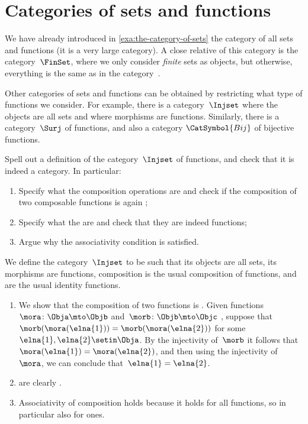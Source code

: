 
\section{Categories of sets and functions}

We have already introduced in \cref{exa:the-category-of-sets} the category of all sets and functions (it is a very large category).
A close relative of this category is the category~$\FinSet$, where we only consider \emph{finite} sets as objects, but otherwise, everything is the same as in the category~\Set.

Other categories of sets and functions can be obtained by restricting what type of functions we consider.
For example, there is a category~$\Injset$ where the objects are all sets and where morphisms are  functions.
Similarly, there is a category~$\Surj$ of  functions, and also a category $\CatSymbol{Bij}$ of bijective functions.

\begin{exercise}
    Spell out a definition of the category~$\Injset$ of  functions, and check that it is indeed a category.
    In particular:
    \begin{enumerate}
        \item Specify what the composition operations are and check if the composition of two composable  functions is again ;
        \item Specify what the   are and check that they are indeed  functions;
        \item Argue why the associativity condition is satisfied.
    \end{enumerate}
\end{exercise}

\begin{solution}
    We define the category~$\Injset$ to be such that its objects are all sets, its morphisms are  functions, composition is the usual composition of functions, and  are the usual identity functions.
    \begin{enumerate}
        \item We show that the composition of two  functions is .
              Given functions~$\mora \colon \Obja \mto \Objb$ and~$\morb \colon \Objb \mto \Objc$ , suppose that~$\morb(\mora (\elna{1})) = \morb(\mora (\elna{2}))$ for some~$\elna{1}, \elna{2} \setin \Obja$.
              By the injectivity of~$\morb$ it follows that~$\mora (\elna{1}) = \mora (\elna{2})$, and then using the injectivity of~$\mora$, we can conclude that~$\elna{1} = \elna{2}$.
        \item {} are clearly .
        \item Associativity of composition holds because it holds for all functions, so in particular also for  ones.
    \end{enumerate}
\end{solution}

